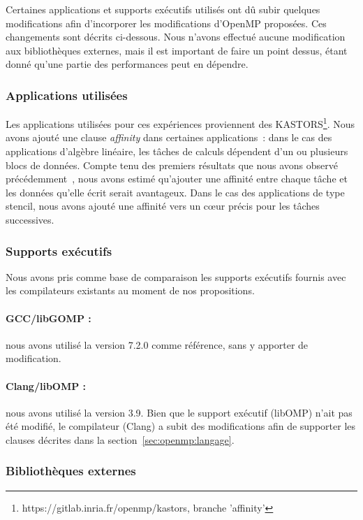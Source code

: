Certaines applications et supports exécutifs utilisés ont dû subir quelques modifications afin d'incorporer les modifications d'OpenMP proposées.
Ces changements sont décrits ci-dessous.
Nous n'avons effectué aucune modification aux bibliothèques externes, mais il est important de faire un point dessus, étant donné qu'une partie des performances peut en dépendre.

\subsubsection{Applications utilisées}

Les applications utilisées pour ces expériences proviennent des KASTORS\footnote{https://gitlab.inria.fr/openmp/kastors, branche 'affinity'}.
Nous avons ajouté une clause \emph{affinity} dans certaines applications~: dans le cas des applications d'algèbre linéaire, les tâches de calculs dépendent d'un ou plusieurs blocs de données.
Compte tenu des premiers résultats que nous avons observé précédemment~\cite{Virouleau2016a}, nous avons estimé qu'ajouter une affinité entre chaque tâche et les données qu'elle écrit serait avantageux.
Dans le cas des applications de type stencil, nous avons ajouté une affinité vers un cœur précis pour les tâches successives.


\subsubsection{Supports exécutifs}


Nous avons pris comme base de comparaison les supports exécutifs fournis avec les compilateurs existants au moment de nos propositions.

\paragraph{GCC/libGOMP :} nous avons utilisé la version 7.2.0 comme référence, sans y apporter de modification.

\paragraph{Clang/libOMP :} nous avons utilisé la version 3.9. Bien que le support exécutif (libOMP) n'ait pas été modifié, le compilateur (Clang) a subit des modifications afin de supporter les clauses décrites dans la section~\ref{sec:openmp:langage}.

\subsubsection{Bibliothèques externes}

